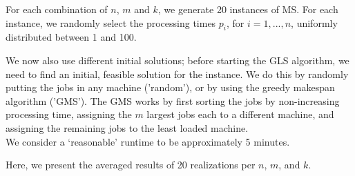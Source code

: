 \documentclass[12pt,a4paper,reqno]{article}
\begin{document}
For each combination of $n$, $m$ and $k$, we generate 20 instances of MS. For each instance, we randomly select the processing times $p_i$, for $i=1,...,n$, uniformly distributed between 1 and 100.


We now also use different initial solutions; before starting the GLS algorithm, we need to find an initial, feasible solution for the instance. We do this by randomly putting the jobs in any machine ('random'), or by using the greedy makespan algorithm ('GMS'). The GMS works by first sorting the jobs by non-increasing processing time, assigning the $m$ largest jobs each to a different machine, and assigning the remaining jobs to the least loaded machine. \\

We consider a `reasonable' runtime to be approximately 5 minutes.

Here, we present the averaged results of 20 realizations per $n$, $m$, and $k$. \\
\end{document}

